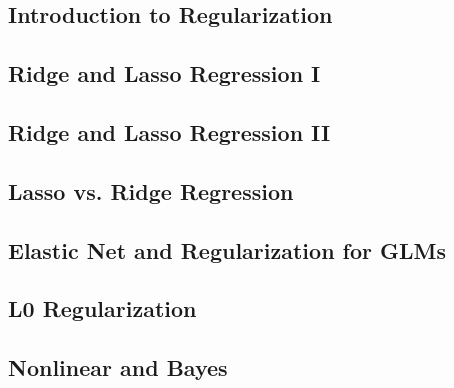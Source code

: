 

\subsection{Introduction to Regularization}


\subsection{Ridge and Lasso Regression I}


\subsection{Ridge and Lasso Regression II}


\subsection{Lasso vs. Ridge Regression}


\subsection{Elastic Net and Regularization for GLMs}


%

\subsection{L0 Regularization}


\subsection{Nonlinear and Bayes}


